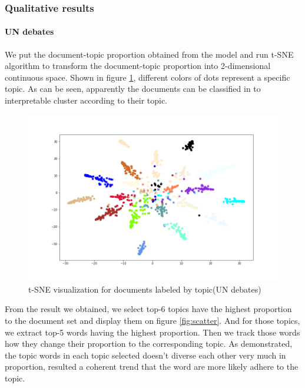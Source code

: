 \subsubsection{Qualitative results}
\paragraph{UN debates}We put the document-topic proportion obtained from the model and run t-SNE algorithm to transform the document-topic proportion into 2-dimensional continuous space. Shown in figure \ref{fig:tsne1}, different colors of dots represent a specific topic. As can be seen, apparently the documents can be classified in to interpretable cluster according to their topic.\\
\begin{figure}[h]
\centering
\includegraphics[width=0.9\linewidth]{figures/1128/tsne1}
\caption{t-SNE visualization for documents labeled by topic(UN debates)}
\label{fig:tsne1}
\end{figure}
From the result we obtained, we select top-6 topics have the highest proportion to the document set and display them on figure \ref{fig:scatter}. And for those topics, we extract top-5 words having the highest proportion. Then we track those words how they change their proportion to the corresponding topic. As demonstrated, the topic words in each topic selected doesn't diverse each other very much in proportion, resulted a coherent trend that the word are more likely adhere to the topic.\\
